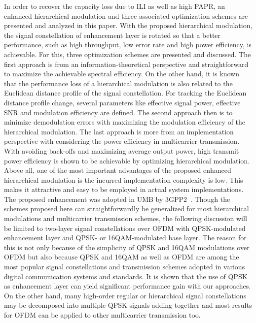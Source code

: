 \documentclass[conference]{IEEEtran}
\begin{document}
In order to recover the capacity loss due to ILI as well as high
PAPR, an enhanced hierarchical modulation and three associated
optimization schemes are presented and analyzed in this paper.
With the proposed hierarchical modulation, the signal
constellation of enhancement layer is rotated so that a better
performance, such as high throughput, low error rate and high
power efficiency, is achievable. For this, three optimization
schemes are presented and discussed. The first approach is from an
information-theoretical perspective and straightforward to
maximize the achievable spectral efficiency. On the other hand, it
is known that the performance loss of a hierarchical modulation is
also related to the Euclidean distance profile of the signal
constellation. For tracking the Euclidean distance profile change,
several parameters like effective signal power, effective SNR and
modulation efficiency are defined. The second approach then is to
minimize demodulation errors with maximizing the modulation
efficiency of the hierarchical modulation. The last approach is
more from an implementation perspective with considering the power
efficiency in multicarrier transmission. With avoiding back-offs
and maximizing average output power, high transmit power
efficiency is shown to be achievable by optimizing hierarchical
modulation. Above all, one of the most important advantages of the
proposed enhanced hierarchical modulation is the incurred
implementation complexity is low. This makes it attractive and
easy to be employed in actual system implementations. The proposed
enhancement was adopted in UMB by 3GPP2~\cite{UMB}. Though the
schemes proposed here can straightforwardly be generalized for
most hierarchical modulations and multicarrier transmission
schemes, the following discussion will be limited to two-layer
signal constellations over OFDM with QPSK-modulated enhancement
layer and QPSK- or 16QAM-modulated base layer. The reason for this
is not only because of the simplicity of QPSK and 16QAM
modulations over OFDM but also because QPSK and 16QAM as well as
OFDM are among the most popular signal constellations and
transmission schemes adopted in various digital communication
systems and standards. It is shown that the use of QPSK as
enhancement layer can yield significant performance gain with our
approaches. On the other hand, many high-order regular or
hierarchical signal constellations may be decomposed into multiple
QPSK signals adding together and most results for OFDM can be
applied to other multicarrier transmission too.
\end{document}
